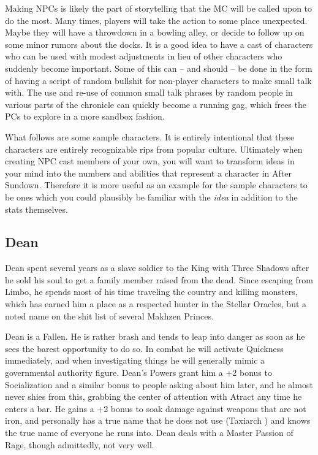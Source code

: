 Making NPCs is likely the part of storytelling that the MC will be called upon to do the most. Many times, players will take the action to some place unexpected. Maybe they will have a throwdown in a bowling alley, or decide to follow up on some minor rumors about the docks. It is a good idea to have a cast of characters who can be used with modest adjustments in lieu of other characters who suddenly become important. Some of this can -- and should -- be done in the form of having a script of random bullshit for non-player characters to make small talk with. The use and re-use of common small talk phrases by random people in various parts of the chronicle can quickly become a running gag, which frees the PCs to explore in a more sandbox fashion.

What follows are some sample characters. It is entirely intentional that these characters are entirely recognizable rips from popular culture. Ultimately when creating NPC cast members of your own, you will want to transform ideas in your mind into the numbers and abilities that represent a character in After Sundown. Therefore it is more useful as an example for the sample characters to be ones which you could plausibly be familiar with the \textit{idea} in addition to the stats themselves.

\subsection{Dean}
\hspace{\parindent} Dean spent several years as a slave soldier to the King with Three Shadows after he sold his soul to get a family member raised from the dead. Since escaping from Limbo, he spends most of his time traveling the country and killing monsters, which has earned him a place as a respected hunter in the Stellar Oracles, but a noted name on the shit list of several Makhzen Princes.

Dean is a Fallen. He is rather brash and tends to leap into danger as soon as he sees the barest opportunity to do so. In combat he will activate Quickness immediately, and when investigating things he will generally mimic a governmental authority figure. Dean's Powers grant him a +2 bonus to Socialization and a similar bonus to people asking about him later, and he almost never shies from this, grabbing the center of attention with Atract any time he enters a bar. He gains a +2 bonus to soak damage against weapons that are not iron, and personally has a true name that he does not use (Taxiarch { }) and knows the true name of everyone he runs into. Dean deals with a Master Passion of Rage, though admittedly, not very well.

